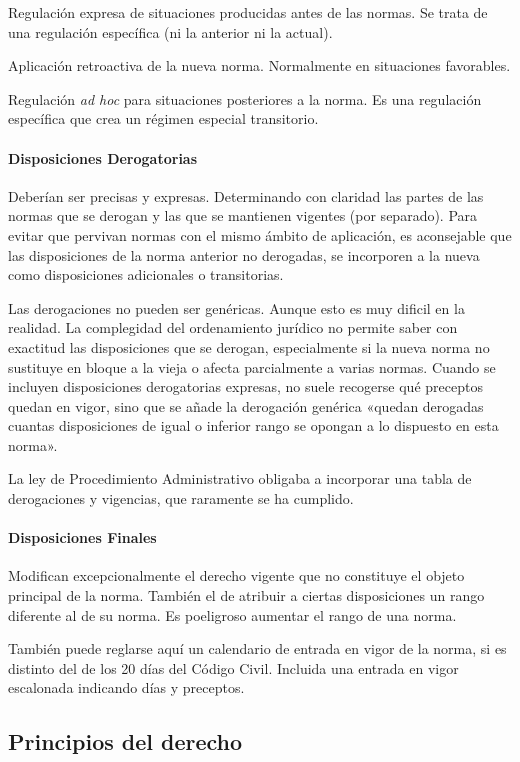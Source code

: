     Regulación expresa de situaciones producidas antes de las normas. Se trata de una regulación específica (ni la anterior ni la actual).

    Aplicación retroactiva de la nueva norma. Normalmente en situaciones favorables.

    Regulación \textit{ad hoc} para situaciones posteriores a la norma. Es una regulación específica que crea un régimen especial transitorio.

\paragraph{Disposiciones Derogatorias}
    Deberían ser precisas y expresas. Determinando con claridad las partes de las normas que se derogan y las que se mantienen vigentes (por separado). Para evitar que pervivan normas con el mismo ámbito de aplicación, es aconsejable que las disposiciones de la norma anterior no derogadas, se incorporen a la nueva como disposiciones adicionales o transitorias.
    
    Las derogaciones no pueden ser genéricas. Aunque esto es muy dificil en la realidad. La complegidad del ordenamiento jurídico no permite saber con exactitud las disposiciones que se derogan, especialmente si la nueva norma no sustituye en bloque a la vieja o afecta parcialmente a varias normas. Cuando se incluyen disposiciones derogatorias expresas, no suele recogerse qué preceptos quedan en vigor, sino que se añade la derogación genérica «quedan derogadas cuantas disposiciones de igual o inferior rango se opongan a lo dispuesto en esta norma».

    La ley de Procedimiento Administrativo obligaba a incorporar una tabla de derogaciones y vigencias, que raramente se ha cumplido.

\paragraph{Disposiciones Finales}
    Modifican excepcionalmente el derecho vigente que no constituye el objeto principal de la norma. También el de atribuir a ciertas disposiciones un rango diferente al de su norma. Es poeligroso aumentar el rango de una norma.

    También puede reglarse aquí un calendario de entrada en vigor de la norma, si es distinto del de los 20 días del Código Civil. Incluida una entrada en vigor escalonada indicando días y preceptos.

\subsection{Principios del derecho}

